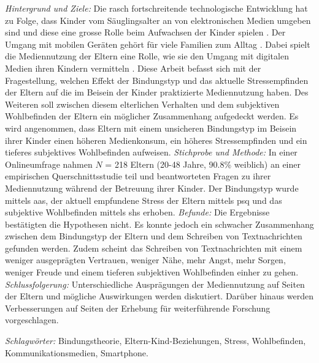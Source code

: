 \begin{flushleft}
\textit{Hintergrund und Ziele:} Die rasch fortschreitende technologische Entwicklung hat zu Folge, dass Kinder vom Säuglingsalter an von elektronischen Medien umgeben sind und diese eine grosse Rolle beim Aufwachsen der Kinder spielen \cite{Feierabend2015}. Der Umgang mit mobilen Geräten gehört für viele Familien zum Alltag \cite{Wagner2016}. Dabei spielt die Mediennutzung der Eltern eine Rolle, wie sie den Umgang mit digitalen Medien ihren Kindern vermitteln \cite{Livingstone2015a}. Diese Arbeit befasst sich mit der Fragestellung, welchen Effekt der Bindungstyp und das aktuelle Stressempfinden der Eltern auf die im Beisein der Kinder praktizierte Mediennutzung haben. Des Weiteren soll zwischen diesem elterlichen Verhalten und dem subjektiven Wohlbefinden der Eltern ein möglicher Zusammenhang aufgedeckt werden. Es wird angenommen, dass Eltern mit einem unsicheren Bindungstyp im Beisein ihrer Kinder einen höheren Medienkonsum, ein höheres Stressempfinden und ein tieferes subjektives Wohlbefinden aufweisen. \textit{Stichprobe und Methode:} In einer Online\-umfrage nahmen $N$ = 218 Eltern (20-48 Jahre, 90.8\% weiblich) an einer empirischen Querschnittsstudie teil und beantworteten Fragen zu ihrer Mediennutzung während der Betreuung ihrer Kinder. Der Bindungstyp wurde mittels \acrfull{aas}, der aktuell empfundene Stress der Eltern mittels \acrfull{psq} und das subjektive Wohlbefinden mittels \acrfull{shs} erhoben. 
\textit{Befunde:} Die Ergebnisse bestätigten die Hypothesen nicht. Es konnte jedoch ein schwacher Zusammenhang zwischen dem Bindungstyp der Eltern und dem Schreiben von Textnachrichten gefunden werden. Zudem scheint das Schreiben von Textnachrichten mit einem weniger ausgeprägten Vertrauen, weniger Nähe, mehr Angst, mehr Sorgen, weniger Freude und einem tieferen subjektiven Wohlbefinden einher zu gehen. 
\textit{Schlussfolgerung:} Unterschiedliche Ausprägungen der Mediennutzung auf Seiten der Eltern und mögliche Auswirkungen werden diskutiert. Darüber hinaus werden Verbesserungen auf Seiten der Erhebung für weiterführende Forschung vorgeschlagen. \linebreak


\textit{Schlagwörter:} Bindungstheorie, Eltern-Kind-Beziehungen, Stress, Wohlbefinden, Kommunikationsmedien, Smartphone.

\end{flushleft}
